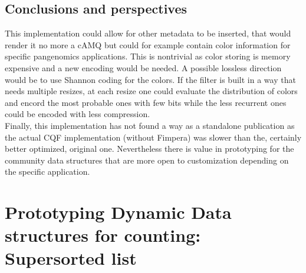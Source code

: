\subsection{Conclusions and perspectives}
This implementation could allow for other metadata to be inserted, that would render it no more a cAMQ but could for example contain color information for specific pangenomics applications. This is nontrivial as color storing is memory expensive and a new encoding would be needed. A possible lossless direction would be to use Shannon coding for the colors. If the filter is built in a way that needs multiple resizes, at each resize one could evaluate the distribution of colors and encord the most probable ones with few bits while the less recurrent ones could be encoded with less compression. \\
Finally, this implementation has not found a way as a standalone publication as the actual CQF implementation (without Fimpera) was slower than the, certainly better optimized, original one.
Nevertheless there is value in prototyping for the community data structures that are more open to customization depending on the specific application.


\section{Prototyping Dynamic Data structures for \kmer counting: Super\kmer sorted list}
\label{sec:skmers}



